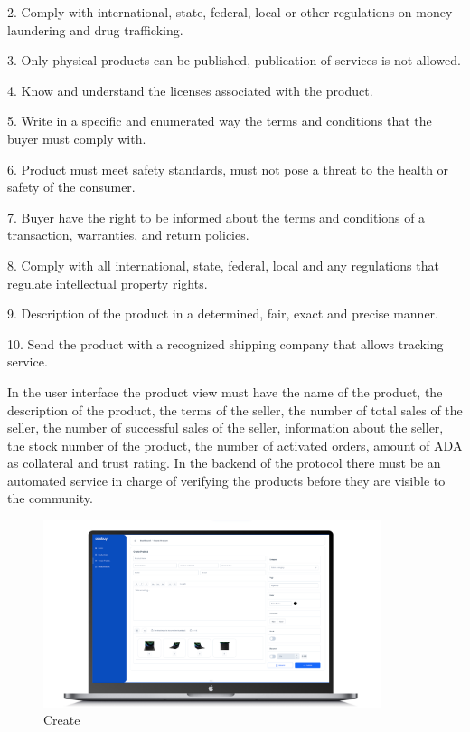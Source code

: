 \documentclass[12pt]{article}
\begin{document}
2. Comply with international, state, federal, local or other regulations on money laundering and drug trafficking.

3. Only physical products can be published, publication of services is not allowed.

4. Know and understand the licenses associated with the product.

5. Write in a specific and enumerated way the terms and conditions that the buyer must comply with.

6. Product must meet safety standards, must not pose a threat to the health or safety of the consumer.

7. Buyer have the right to be informed about the terms and conditions of a transaction, warranties, and return policies.

8. Comply with all international, state, federal, local and any regulations that regulate intellectual property rights.

9. Description of the product in a determined, fair, exact and precise manner.

10. Send the product with a recognized shipping company that allows tracking service.

In the user interface the product view must have the name of the product, the description of the product, the terms of the seller, the number of total sales of the seller, the number of successful sales of the seller, information about the seller, the stock number of the product, the number of activated orders, amount of ADA as collateral and trust rating. In the backend of the protocol there must be an automated service in charge of verifying the products before they are visible to the community.
\begin{figure}[ht]
  \centering
  \includegraphics[width=0.88\textwidth, keepaspectratio]{create-product.png}
  \caption{Create}
  \label{fig:web}
\end{figure}
\end{document}
